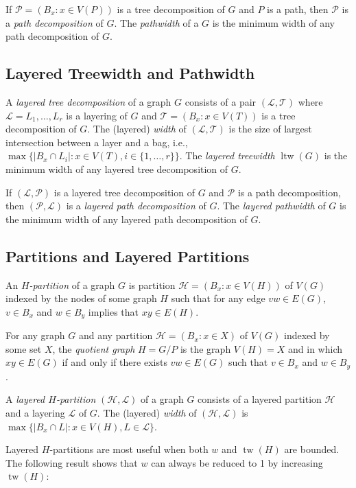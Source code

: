 \documentclass[kpfonts]{patmorin}
\DeclareMathOperator{\tw}{tw}
\DeclareMathOperator{\ltw}{ltw}
\begin{document}
If $\mathcal{P}=(B_x:x\in V(P))$ is a tree decomposition of $G$ and $P$ is a path, then $\mathcal{P}$ is a \emph{path decomposition} of $G$.  The \emph{pathwidth} of a $G$ is the minimum width of any path decomposition of $G$.

\subsection{Layered Treewidth and Pathwidth}

A \emph{layered tree decomposition} of a graph $G$ consists of a pair $(\mathcal{L},\mathcal{T})$ where $\mathcal{L}=L_1,\ldots,L_r$ is a layering of $G$ and $\mathcal{T}=(B_x:x\in V(T))$ is a tree decomposition of $G$.  The (layered) \emph{width} of $(\mathcal{L},\mathcal{T})$ is the size of largest intersection between a layer and a bag, i.e., $\max\{|B_x\cap L_i|:x\in V(T), i\in\{1,\ldots,r\}\}$.  The \emph{layered treewidth} $\ltw(G)$ is the minimum width of any layered tree decomposition of $G$.

If $(\mathcal{L},\mathcal{P})$ is a layered tree decomposition of $G$ and $\mathcal{P}$ is a path decomposition, then $(\mathcal{P},\mathcal{L})$ is a \emph{layered path decomposition} of $G$.  The \emph{layered pathwidth} of $G$ is the minimum width of any layered path decomposition of $G$.

\subsection{Partitions and Layered Partitions}

An \emph{$H$-partition} of a graph $G$ is partition $\mathcal{H}=(B_x:x\in V(H))$ of $V(G)$ indexed by the nodes of some graph $H$ such that for any edge $vw\in E(G)$, $v\in B_x$ and $w\in B_y$ implies that $xy\in E(H)$.

For any graph $G$ and any partition $\mathcal{H}=(B_x:x\in X)$ of $V(G)$ indexed by some set $X$, the \emph{quotient graph} $H=G/P$ is the graph $V(H)=X$ and in which $xy\in E(G)$ if and only if there exists $vw\in E(G)$ such that $v\in B_x$ and $w\in B_y$.

A \emph{layered $H$-partition} $(\mathcal{H},\mathcal{L})$ of a graph $G$ consists of a layered partition $\mathcal{H}$ and a layering $\mathcal{L}$ of $G$.  The (layered) \emph{width} of $(\mathcal{H},\mathcal{L})$ is $\max\{|B_x\cap L|:x\in V(H), L\in\mathcal{L}\}$.

Layered $H$-partitions are most useful when both $w$ and $\tw(H)$ are bounded.  The following result shows that $w$ can always be reduced to 1 by increasing $\tw(H)$:
\end{document}
